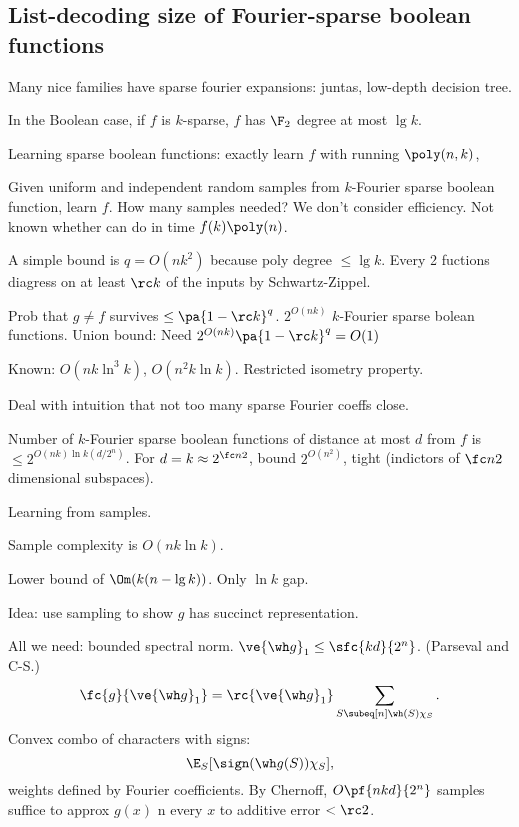 
\subsection{List-decoding size of Fourier-sparse boolean functions}
Many nice families have sparse fourier expansions: juntas, low-depth decision tree.

In the Boolean case, if $f$ is $k$-sparse, $f$ has $\F_2$ degree at most $\lg k$.

Learning sparse boolean functions: exactly learn $f$ with running $\poly(n,k)$,

Given uniform and independent random samples from $k$-Fourier sparse boolean function, learn $f$. How many samples needed? We don't consider efficiency. Not known whether can do in time $f(k)\poly(n)$.

A simple bound is $q=O(nk^2)$ because poly degree $\le \lg k$. Every 2 fuctions diagress on at least $\rc k$ of the inputs by Schwartz-Zippel.

Prob that $g\ne f$ survives $\le \pa{1-\rc k}^q$.
$2^{O(nk)}$ $k$-Fourier sparse bolean functions.
Union bound: Need $2^{O(nk)}\pa{1-\rc k}^q=O(1)$

Known: $O(nk\ln^3k)$, $O(n^2k\ln k)$. Restricted isometry property.

Deal with intuition that not too many sparse Fourier coeffs close.


\begin{thm}
Number of $k$-Fourier sparse boolean functions of distance at most $d$ from $f$ is $\le 2^{O(nk)\ln k (d/2^n)}$. For $d=k\approx 2^{\fc n2}$, bound $2^{O(n^2)}$, tight (indictors of $\fc n2$ dimensional subspaces).
\end{thm}

Learning from samples.

\begin{thm}
Sample complexity is $O(nk\ln k)$.
\end{thm}
Lower bound of $\Om(k(n-\lg k))$. Only $\ln k$ gap.


Idea: use sampling to show $g$ has succinct representation.

All we need: bounded spectral norm. $\ve{\wh g}_1\le \sfc{kd}{2^n}$. (Parseval and C-S.)
\[
\fc{g}{\ve{\wh g}_1}=\rc{\ve{\wh g}_1} \sum_{S\subeq [n]\wh (S)\chi_S}.
\]
Convex combo of characters with signs:
\[
\E_S [\sign(\wh g(S))\chi_S],
\]
weights defined by Fourier coefficients. %
By Chernoff, $O\pf{nkd}{2^n}$ samples suffice to approx $g(x)$ n every $x$ to additive error $<\rc 2$.

